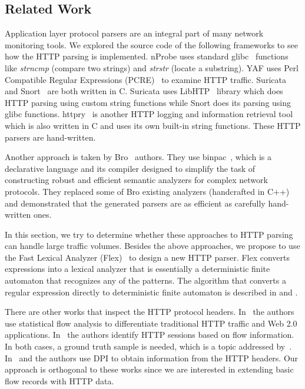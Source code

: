 \subsection{Related Work} \label{subsec:http-related_work}

Application layer protocol parsers are an integral part of many network monitoring tools. We explored the source code of the following frameworks to see how the HTTP parsing is implemented. nProbe uses standard glibc~\cite{GNUProject-2017-GNU} functions like \emph{strncmp} (compare two strings) and \emph{strstr} (locate a substring). YAF uses Perl Compatible Regular Expressions (PCRE)~\cite{Hazel-2015-PCRE} to examine HTTP traffic. Suricata~\cite{OISF-2017-Suricata} and Snort~\cite{Roesch-1999-Snort} are both written in C. Suricata uses LibHTP~\cite{Qualys-2017-LibHTP} library which does HTTP parsing using custom string functions while Snort does its parsing using glibc functions. httpry~\cite{Bittel-2014-httpry} is another HTTP logging and information retrieval tool which is also written in C and uses its own built-in string functions. These HTTP parsers are hand-written.

Another approach is taken by Bro~\cite{Paxson-1999-Bro} authors. They use binpac~\cite{Pang-2006-binpac}, which is a declarative language and its compiler designed to simplify the task of constructing robust and efficient semantic analyzers for complex network protocols. They replaced some of Bro existing analyzers (handcrafted in C++) and demonstrated that the generated parsers are as efficient as carefully hand-written ones.

In this section, we try to determine whether these approaches to HTTP parsing can handle large traffic volumes. Besides the above approaches, we propose to use the Fast Lexical Analyzer (Flex)~\cite{Levine-2009-Flex} to design a new HTTP parser. Flex converts expressions into a lexical analyzer that is essentially a deterministic finite automaton that recognizes any of the patterns. The algorithm that converts a regular expression directly to deterministic finite automaton is described in \cite{Lesk-1975-Lex} and \cite{McNaughton-1960-Regular}.

There are other works that inspect the HTTP protocol headers. In~\cite{Schneider-2008-new} the authors use statistical flow analysis to differentiate traditional HTTP traffic and Web 2.0 applications. In~\cite{Torres-2012-Identifying} the authors identify HTTP sessions based on flow information. In both cases, a ground truth sample is needed, which is a topic addressed by~\cite{Torres-2012-Strategies}. In~\cite{Gehlen-2012-Uncovering} and \cite{Mahanti-2011-Characterizing} the authors use DPI to obtain information from the HTTP headers. Our approach is orthogonal to these works since we are interested in extending basic flow records with HTTP data.

